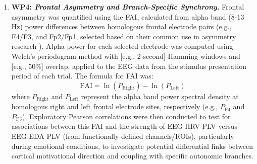 \begin{enumerate}[label=(\alph*)]
    \item \textbf{\gls{WP}4: \emph{Frontal Asymmetry and Branch-Specific Synchrony}.} Frontal asymmetry was quantified using the \gls{FAI}, calculated from alpha band (8-13 Hz) power differences between homologous frontal electrode pairs (e.g., F4/F3, and Fp2/Fp1, selected based on their common use in asymmetry research \parencite{rodriguesMethodsMatterExamination2021, allenIssuesAssumptionsRoad2004}). Alpha power for each selected electrode was computed using Welch's periodogram method with [e.g., 2-second] Hamming windows and [e.g., 50\%] overlap, applied to the EEG data from the stimulus presentation period of each trial. The formula for \gls{FAI} was:
    \begin{equation}
        \text{FAI} = \ln(P_{\text{Right}}) - \ln(P_{\text{Left}})
        \label{eq:fai} %
    \end{equation}
    where $P_{\text{Right}}$ and $P_{\text{Left}}$ represent the alpha band power spectral density at homologous right and left frontal electrode sites, respectively (e.g., $P_{\text{F4}}$ and $P_{\text{F3}}$). Exploratory Pearson correlations were then conducted to test for associations between this \gls{FAI} and the strength of \gls{EEG}-\gls{HRV} \gls{PLV} versus \gls{EEG}-\gls{EDA} \gls{PLV} (from functionally defined channels/\gls{ROI}s), particularly during emotional conditions, to investigate potential differential links between cortical motivational direction and coupling with specific autonomic branches.
\end{enumerate}